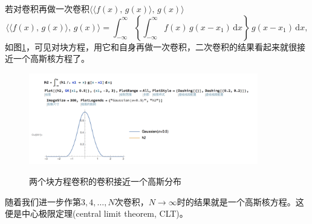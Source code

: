 \begin{subappendices}
若对卷积再做一次卷积$  \langle \langle f(x), \, g (x) \rangle, \, g (x) \rangle$
\begin{equation*}
  \Big\langle \langle f(x), \, g (x) \rangle, \, g (x) \Big\rangle
  = \int_{-\infty}^{\infty}
  \left\{
  \int_{-\infty}^{\infty} f \left( x \right) \, g \left( x - x_{1} \right) \, \mathrm{d} x
  \right\}
  \, g \left( x - x_{1} \right) \, \mathrm{d} x,
\end{equation*}
如图\ref{fig:convolution-fg-2}，可见对块方程，用它和自身再做一次卷积，二次卷积的结果看起来就很接近一个高斯核方程了。
\begin{figure}[htbp]
  \caption{两个块方程卷积的卷积接近一个高斯分布}
  \centering
  \includegraphics[width=10cm]{./Figures/20180405-convolution-fg-2}
  \label{fig:convolution-fg-2}
%
\end{figure}

随着我们进一步作第$3,4,\ldots,N$次卷积，$N \rightarrow \infty$时的结果就是一个高斯核方程。这便是中心极限定理(central limit theorem, CLT)。


\end{subappendices}
